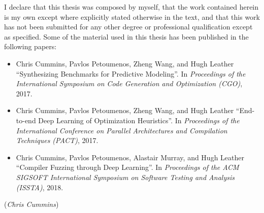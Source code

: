 I declare that this thesis was composed by myself, that the work contained herein is my own except where explicitly stated otherwise in the text, and that this work has not been submitted for any other degree or professional qualification except as specified. Some of the material used in this thesis has been published in the following papers:
\begin{itemize}
	\item Chris Cummins, Pavlos Petoumenos, Zheng Wang, and Hugh Leather ``Synthesizing Benchmarks for Predictive Modeling''. In \emph{Proceedings of the International Symposium on Code Generation and Optimization (CGO)}, 2017.
	\item Chris Cummins, Pavlos Petoumenos, Zheng Wang, and Hugh Leather ``End-to-end Deep Learning of Optimization Heuristics''. In \emph{Proceedings of the International Conference on Parallel Architectures and Compilation Techniques (PACT)}, 2017.
	\item Chris Cummins, Pavlos Petoumenos, Alastair Murray, and Hugh Leather ``Compiler Fuzzing through Deep Learning''. In \emph{Proceedings of the ACM SIGSOFT International Symposium on Software Testing and Analysis (ISSTA)}, 2018.
\end{itemize}
\vspace{1in}\raggedleft({\em Chris Cummins\/})
